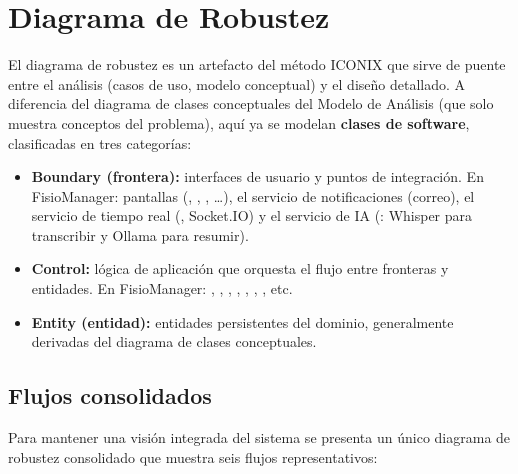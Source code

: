 
\chapter{Diagrama de Robustez}\label{ch:diagramarobustez}

El diagrama de robustez es un artefacto del método ICONIX que sirve de puente entre el análisis (casos de uso, modelo conceptual) y el diseño detallado. A diferencia del diagrama de clases conceptuales del Modelo de Análisis (que solo muestra conceptos del problema), aquí ya se modelan \textbf{clases de software}, clasificadas en tres categorías:

\begin{itemize}
  \item \textbf{Boundary (frontera):} interfaces de usuario y puntos de integración. En FisioManager: pantallas (, , , \ldots), el servicio de notificaciones (correo), el servicio de tiempo real (, Socket.IO) y el servicio de IA (: Whisper para transcribir y Ollama para resumir).
  \item \textbf{Control:} lógica de aplicación que orquesta el flujo entre fronteras y entidades. En FisioManager: , , , , , , , etc.
  \item \textbf{Entity (entidad):} entidades persistentes del dominio, generalmente derivadas del diagrama de clases conceptuales.
\end{itemize}

\section{Flujos consolidados}

Para mantener una visión integrada del sistema se presenta un único diagrama de robustez consolidado que muestra seis flujos representativos:


